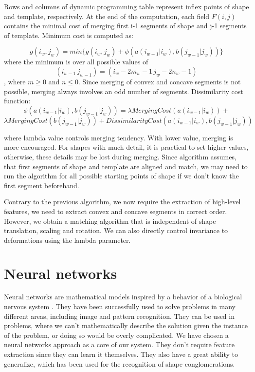 Rows and columns of dynamic programming table represent inflex points of shape and template, respectively. At the end of the computation, each field $F(i,j)$ contains the minimal cost of merging first i-1 segments of shape and j-1 segments of template. Minimum cost is computed as:

\begin{equation*}
g(i_{w},j_{w}) = min\{g(i_{w},j_{w}) + \phi(a(i_{w-1}|i_{w}), b(j_{w-1}|j_{w}))\}
\end{equation*}
where the minimum is over all possible values of 
\begin{equation*}
(i_{w-1}\,j_{w-1})  =  (i_{w} - 2m_{w} -1\, j_{w} - 2n_{w} - 1)
\end{equation*}
, where $m \geq 0$ and $n \leq 0$.
Since merging of convex and concave segments is not possible, merging always involves an odd number of segments. Dissimilarity cost function: 
\begin{equation*}
\phi(a(i_{w-1}|i_{w}), b(j_{w-1}|j_{w}))  =  \lambda MergingCost(a(i_{w-1}|i_{w}))  +
\end{equation*}
\begin{equation*} 
\lambda MergingCost(b(j_{w-1}|j_{w}))  +  DissimilarityCost(a(i_{w-1}|i_{w}), b(j_{w-1}|j_{w}))
\end{equation*}

where lambda value controls merging tendency. With lower value, merging is more encouraged. For shapes with much detail, it is practical to set higher values, otherwise, these details may be lost during merging. 
Since algorithm assumes, that first segments of shape and template are aligned and match, we may need to run the algorithm for all possible starting points of shape if we don't know the first segment beforehand.

Contrary to the previous algorithm, we now require the extraction of high-level features, we need to extract convex and concave segments in correct order. However, we obtain a matching algorithm that is independent of shape translation, scaling and rotation. We can also directly control invariance to deformations using the lambda parameter.

\section{Neural networks}
Neural networks are mathematical models inspired by a behavior of a biological nervous system \cite{bishop}. They have been successfully used to solve problems in many different areas, including image and pattern recognition. They can be used in problems, where we can't mathematically describe the solution given the instance of the problem, or doing so would be overly complicated. We have chosen a neural networks approach as a core of our system. They don't require feature extraction since they can learn it themselves. They also have a great ability to generalize, which has been used for the recognition of shape conglomerations.

